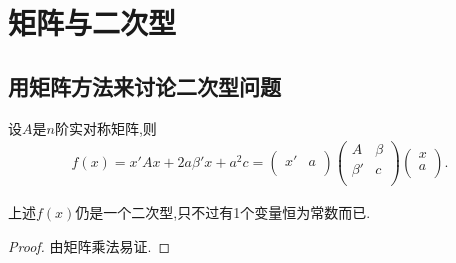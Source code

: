 \documentclass[../../main.tex]{subfiles}
\begin{document}
\section{矩阵与二次型}

\subsection{用矩阵方法来讨论二次型问题}

\begin{lemma}\label{lemma:一般二次型的矩阵形式}
设$A$是$n$阶实对称矩阵,则
\begin{align*}
f\left( x \right) =x' Ax+2a\beta ' x+a^2c=\left( \begin{matrix}
x'&		a\\
\end{matrix} \right) \left( \begin{matrix}
A&		\beta\\
\beta '&		c\\
\end{matrix} \right) \left( \begin{array}{c}
x\\
a\\
\end{array} \right) .
\end{align*}
\end{lemma}
\begin{remark}
上述$f(x)$仍是一个二次型,只不过有1个变量恒为常数而已.
\end{remark}
\begin{proof}
由矩阵乘法易证.

\end{proof}
\end{document}
